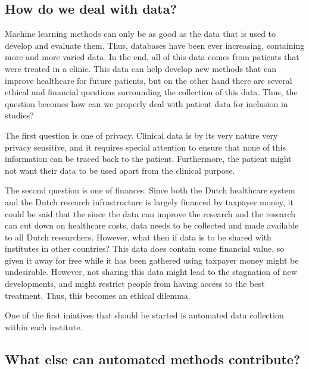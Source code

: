 \subsection{How do we deal with data?}

Machine learning methods can only be as good as the data that is used to develop and evaluate them.
Thus, databases have been ever increasing, containing more and more varied data.
In the end, all of this data comes from patients that were treated in a clinic.
This data can help develop new methods that can improve healthcare for future patients, but on the other hand there are several ethical and financial questions surrounding the collection of this data.
Thus, the question becomes how can we properly deal with patient data for inclusion in studies?

The first question is one of privacy.
Clinical data is by its very nature very privacy sensitive, and it requires special attention to ensure that none of this information can be traced back to the patient.
Furthermore, the patient might not want their data to be used apart from the clinical purpose.

The second question is one of finances.
Since both the Dutch healthcare system and the Dutch research infrastructure is largely financed by taxpayer money, it could be said that the since the data can improve the research and the research can cut down on healthcare costs, data needs to be collected and made available to all Dutch researchers.
However, what then if data is to be shared with institutes in other countries?
This data does contain some financial value, so given it away for free while it has been gathered using taxpayer money might be undesirable.
However, not sharing this data might lead to the stagnation of new developments, and might restrict people from having access to the best treatment.
Thus, this becomes an ethical dilemma.

One of the first iniatives that should be started is automated data collection within each institute.

\subsection{What else can automated methods contribute?}


